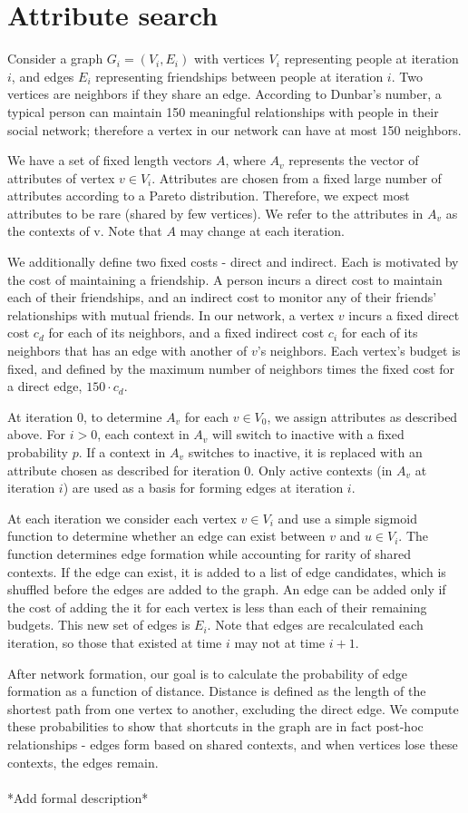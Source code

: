 \documentclass{article}
\begin{document}
\section{Attribute search}

Consider a graph $G_i = (V_i, E_i)$ with vertices $V_i$ representing people at iteration $i$, and edges $E_i$ representing friendships between people at iteration $i$. Two vertices are neighbors if they share an edge. According to Dunbar's number, a typical person can maintain 150 meaningful relationships with people in their social network; therefore a vertex in our network can have at most 150 neighbors.

We have a set of fixed length vectors $A$, where $A_v$ represents the vector of attributes of vertex $v \in V_i$. Attributes are chosen from a fixed large number of attributes according to a Pareto distribution. Therefore, we expect most attributes to be rare (shared by few vertices). We refer to the attributes in $A_v$ as the contexts of v. Note that $A$ may change at each iteration.

We additionally define two fixed costs - direct and indirect. Each is motivated by the cost of maintaining a friendship. A person incurs a direct cost to maintain each of their friendships, and an indirect cost to monitor any of their friends' relationships with mutual friends. In our network, a vertex $v$ incurs a fixed direct cost $c_d$ for each of its neighbors, and a fixed indirect cost $c_i$ for each of its neighbors that has an edge with another of $v$'s neighbors. Each vertex's budget is fixed, and defined by the maximum number of neighbors times the fixed cost for a direct edge, $150\cdot c_d$.

At iteration 0, to determine $A_v$ for each $v \in V_0$, we assign attributes as described above. For $i>0$, each context in $A_v$ will switch to inactive with a fixed probability $p$. If a context in $A_v$ switches to inactive, it is replaced with an attribute chosen as described for iteration 0. Only active contexts (in $A_v$ at iteration $i$) are used as a basis for forming edges at iteration $i$.

At each iteration we consider each vertex $v \in V_i$ and use a simple sigmoid function to determine whether an edge can exist between $v$ and $u\in V_i$. The function determines edge formation while accounting for rarity of shared contexts. If the edge can exist, it is added to a list of edge candidates, which is shuffled before the edges are added to the graph. An edge can be added only if the cost of adding the it for each vertex is less than each of their remaining budgets. This new set of edges is $E_i$. Note that edges are recalculated each iteration, so those that existed at time $i$ may not at time $i+1$.

After network formation, our goal is to calculate the probability of edge formation as a function of distance. Distance is defined as the length of the shortest path from one vertex to another, excluding the direct edge. We compute these probabilities to show that shortcuts in the graph are in fact post-hoc relationships - edges form based on shared contexts, and when vertices lose these contexts, the edges remain.\\\\
*Add formal description*
\end{document}
